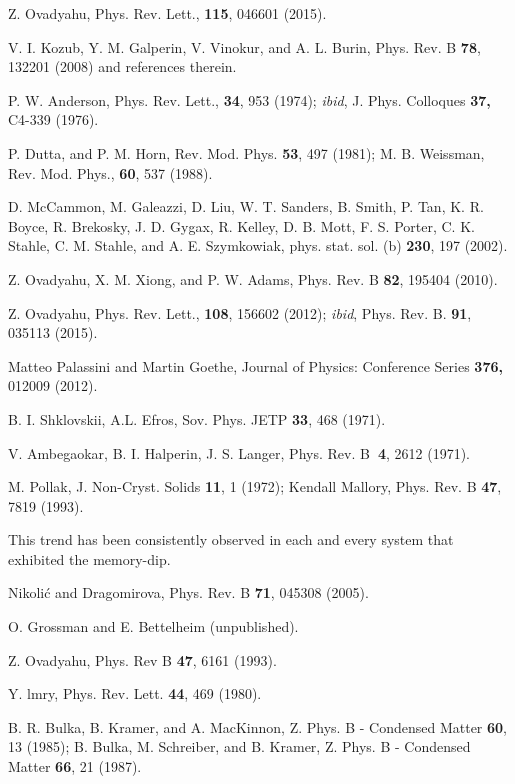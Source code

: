 \documentclass
[preprint,showpacs,byrevtex,10pt,twocolumn,tightenlines,prl,letterpaper]{revtex4}%
\begin{document}
\begin{thebibliography}{99}
Z. Ovadyahu, Phys. Rev. Lett., \textbf{115}, 046601 (2015).

V. I. Kozub, Y. M. Galperin, V. Vinokur, and A. L. Burin, Phys.
Rev. B \textbf{78}, 132201 (2008) and references therein.

P. W. Anderson, Phys. Rev. Lett., \textbf{34}, 953 (1974);
\textit{ibid}, J. Phys. Colloques \textbf{37, }C4-339 (1976).

P. Dutta, and P. M. Horn, Rev. Mod. Phys. \textbf{53}, 497
(1981); M. B. Weissman, Rev. Mod. Phys., \textbf{60}, 537 (1988).

D. McCammon, M. Galeazzi, D. Liu, W. T. Sanders, B. Smith, P.
Tan, K. R. Boyce, R. Brekosky, J. D. Gygax, R. Kelley, D. B. Mott, F. S.
Porter, C. K. Stahle, C. M. Stahle, and A. E. Szymkowiak, phys. stat. sol. (b)
\textbf{230}, 197 (2002).

Z. Ovadyahu, X. M. Xiong, and P. W. Adams, Phys. Rev. B
\textbf{82}, 195404 (2010).

Z. Ovadyahu, Phys. Rev. Lett., \textbf{108}, 156602 (2012);
\textit{ibid}, Phys. Rev. B. \textbf{91}, 035113 (2015).

Matteo Palassini and Martin Goethe, Journal of Physics:
Conference Series \textbf{376,} 012009 (2012).

B. I. Shklovskii, A.L. Efros, Sov. Phys. JETP \textbf{33}, 468 (1971).

V. Ambegaokar, B. I. Halperin, J. S. Langer, Phys. Rev.
B\textbf{\ 4}, 2612 (1971).

M. Pollak, J. Non-Cryst. Solids \textbf{11}, 1 (1972); Kendall
Mallory, Phys. Rev. B \textbf{47}, 7819 (1993).

This trend has been consistently observed in each and every
system that exhibited the memory-dip.

Nikoli\'{c} and Dragomirova, Phys. Rev. B \textbf{71}, 045308 (2005).

O. Grossman and E. Bettelheim (unpublished).

Z. Ovadyahu, Phys. Rev B \textbf{47}, 6161 (1993).

Y. lmry, Phys. Rev. Lett. \textbf{44}, 469 (1980).

B. R. Bulka, B. Kramer, and A. MacKinnon, Z. Phys. B - Condensed
Matter \textbf{60}, 13 (1985); B. Bulka, M. Schreiber, and B. Kramer, Z. Phys.
B - Condensed Matter \textbf{66}, 21 (1987).


\end{thebibliography}
\end{document}
